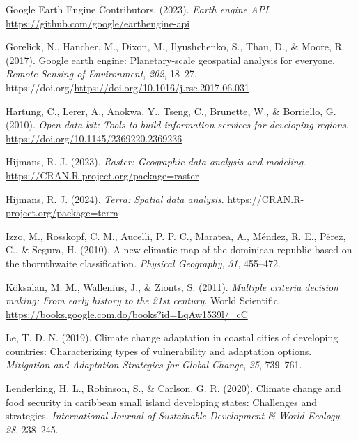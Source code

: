 \documentclass[spanish]{article}
\newlength{\cslhangindent}
\newlength{\cslentryspacingunit} %
\newenvironment{CSLReferences}[2] %
 {%
  \setlength{\parindent}{0pt}
  \ifodd #1
  \let\oldpar\par
  \def\par{\hangindent=\cslhangindent\oldpar}
  \fi
  \setlength{\parskip}{#2\cslentryspacingunit}
 }%
 {}
\begin{document}
\begin{CSLReferences}{1}{0}
\leavevmode{}%
Google Earth Engine Contributors. (2023). \emph{Earth engine API}.
\url{https://github.com/google/earthengine-api}

\leavevmode{}%
Gorelick, N., Hancher, M., Dixon, M., Ilyushchenko, S., Thau, D., \&
Moore, R. (2017). Google earth engine: Planetary-scale geospatial
analysis for everyone. \emph{Remote Sensing of Environment}, \emph{202},
18--27. https://doi.org/\url{https://doi.org/10.1016/j.rse.2017.06.031}

\leavevmode{}%
Hartung, C., Lerer, A., Anokwa, Y., Tseng, C., Brunette, W., \&
Borriello, G. (2010). \emph{Open data kit: Tools to build information
services for developing regions}.
\url{https://doi.org/10.1145/2369220.2369236}

\leavevmode{}%
Hijmans, R. J. (2023). \emph{Raster: Geographic data analysis and
modeling}. \url{https://CRAN.R-project.org/package=raster}

\leavevmode{}%
Hijmans, R. J. (2024). \emph{Terra: Spatial data analysis}.
\url{https://CRAN.R-project.org/package=terra}

\leavevmode{}%
Izzo, M., Rosskopf, C. M., Aucelli, P. P. C., Maratea, A., Méndez, R.
E., Pérez, C., \& Segura, H. (2010). A new climatic map of the dominican
republic based on the thornthwaite classification. \emph{Physical
Geography}, \emph{31}, 455--472.

\leavevmode{}%
Köksalan, M. M., Wallenius, J., \& Zionts, S. (2011). \emph{Multiple
criteria decision making: From early history to the 21st century}. World
Scientific. \url{https://books.google.com.do/books?id=LqAw1539l/_cC}

\leavevmode{}%
Le, T. D. N. (2019). Climate change adaptation in coastal cities of
developing countries: Characterizing types of vulnerability and
adaptation options. \emph{Mitigation and Adaptation Strategies for
Global Change}, \emph{25}, 739--761.

\leavevmode{}%
Lenderking, H. L., Robinson, S., \& Carlson, G. R. (2020). Climate
change and food security in caribbean small island developing states:
Challenges and strategies. \emph{International Journal of Sustainable
Development \& World Ecology}, \emph{28}, 238--245.


\end{CSLReferences}
\end{document}
